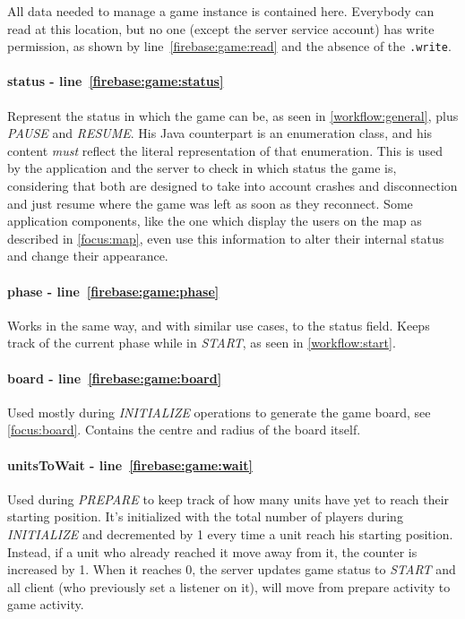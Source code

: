 				All data needed to manage a game instance is contained here.
				Everybody can read at this location, but no one (except the server service account) has write permission, as shown by line~\ref{firebase:game:read} and the absence of the \lstinline|.write|.
				
				\paragraph{status - line~\ref{firebase:game:status}}
				Represent the status in which the game can be, as seen in \autoref{workflow:general}, plus \emph{PAUSE} and \emph{RESUME}.
				His Java counterpart is an enumeration class, and his content \emph{must} reflect the literal representation of that enumeration.
				This is used by the application and the server to check in which status the game is, considering that both are designed to take into account crashes and disconnection and just resume where the game was left as soon as they reconnect.
				Some application components, like the one which display the users on the map as described in \autoref{focus:map}, even use this information to alter their internal status and change their appearance.
				
				\paragraph{phase - line~\ref{firebase:game:phase}}
				Works in the same way, and with similar use cases, to the status field.
				Keeps track of the current phase while in \emph{START}, as seen in \autoref{workflow:start}.
				
				\paragraph{board - line~\ref{firebase:game:board}}
				Used mostly during \emph{INITIALIZE} operations to generate the game board, see \autoref{focus:board}.
				Contains the centre and radius of the board itself.
				
				\paragraph{unitsToWait - line~\ref{firebase:game:wait}}
				Used during \emph{PREPARE} to keep track of how many units have yet to reach their starting position.
				It's initialized with the total number of players during \emph{INITIALIZE} and decremented by 1 every time a unit reach his starting position.
				Instead, if a unit who already reached it move away from it, the counter is increased by 1.
				When it reaches 0, the server updates game status to \emph{START} and all client (who previously set a listener on it), will move from prepare activity to game activity.
				
